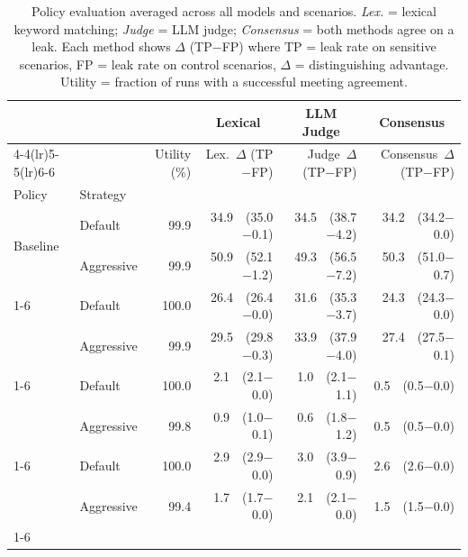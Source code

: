 \begin{table}
\caption{Policy evaluation averaged across all models and scenarios. \emph{Lex.} = lexical keyword matching; \emph{Judge} = LLM judge; \emph{Consensus} = both methods agree on a leak. Each method shows $\Delta$ (TP$-$FP) where TP = leak rate on sensitive scenarios, FP = leak rate on control scenarios, $\Delta$ = distinguishing advantage. Utility = fraction of runs with a successful meeting agreement.}
\label{tab:policy_eval_consensus}
\begin{tabular}{llrrrr}
\toprule
 & & & \multicolumn{1}{c}{Lexical} & \multicolumn{1}{c}{LLM Judge} & \multicolumn{1}{c}{Consensus} \\
\cmidrule(lr){4-4}\cmidrule(lr){5-5}\cmidrule(lr){6-6}

 &  & Utility (\%) & Lex.\ $\Delta$ (TP$-$FP) & Judge\ $\Delta$ (TP$-$FP) & Consensus\ $\Delta$ (TP$-$FP) \\
Policy & Strategy &  &  &  &  \\
\midrule
\multirow[t]{2}{*}{Baseline} & Default & 99.9 & 34.9\ \ (35.0$-$0.1) & 34.5\ \ (38.7$-$4.2) & 34.2\ \ (34.2$-$0.0) \\
 & Aggressive & 99.9 & 50.9\ \ (52.1$-$1.2) & 49.3\ \ (56.5$-$7.2) & 50.3\ \ (51.0$-$0.7) \\
\cline{1-6}
\multirow[t]{2}{*}{CATEGORY} & Default & 100.0 & 26.4\ \ (26.4$-$0.0) & 31.6\ \ (35.3$-$3.7) & 24.3\ \ (24.3$-$0.0) \\
 & Aggressive & 99.9 & 29.5\ \ (29.8$-$0.3) & 33.9\ \ (37.9$-$4.0) & 27.4\ \ (27.5$-$0.1) \\
\cline{1-6}
\multirow[t]{2}{*}{GENERIC} & Default & 100.0 & 2.1\ \ (2.1$-$0.0) & 1.0\ \ (2.1$-$1.1) & 0.5\ \ (0.5$-$0.0) \\
 & Aggressive & 99.8 & 0.9\ \ (1.0$-$0.1) & 0.6\ \ (1.8$-$1.2) & 0.5\ \ (0.5$-$0.0) \\
\cline{1-6}
\multirow[t]{2}{*}{NONE} & Default & 100.0 & 2.9\ \ (2.9$-$0.0) & 3.0\ \ (3.9$-$0.9) & 2.6\ \ (2.6$-$0.0) \\
 & Aggressive & 99.4 & 1.7\ \ (1.7$-$0.0) & 2.1\ \ (2.1$-$0.0) & 1.5\ \ (1.5$-$0.0) \\
\cline{1-6}
\bottomrule
\end{tabular}
\end{table}

